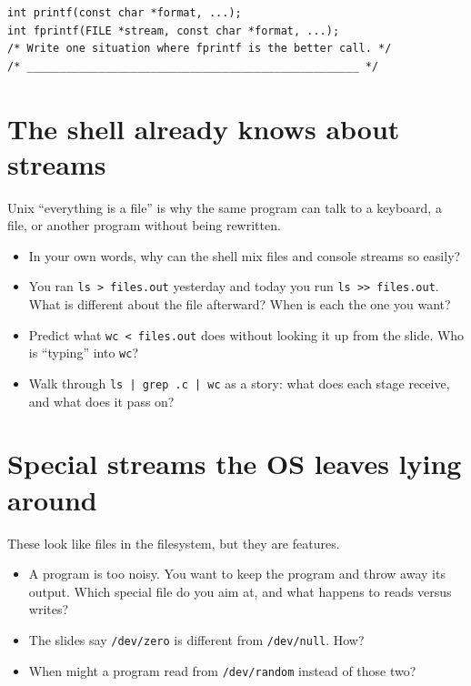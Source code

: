 \documentclass[12pt]{article}
\begin{document}
\begin{lstlisting}
int printf(const char *format, ...);
int fprintf(FILE *stream, const char *format, ...);
/* Write one situation where fprintf is the better call. */
/* ___________________________________________________ */
\end{lstlisting}

\vspace{1.8em}

\section{The shell already knows about streams}

Unix ``everything is a file'' is why the same program can talk to a keyboard, a file, or another program without being rewritten.

\begin{itemize}
  \item In your own words, why can the shell mix files and console streams so easily?
  \vspace{2.2em}
  \item You ran \texttt{ls > files.out} yesterday and today you run \texttt{ls >> files.out}. What is different about the file afterward? When is each the one you want?
  \vspace{2.4em}
  \item Predict what \texttt{wc < files.out} does without looking it up from the slide. Who is ``typing'' into \texttt{wc}?
  \vspace{2.2em}
  \item Walk through \texttt{ls | grep .c | wc} as a story: what does each stage receive, and what does it pass on?
  \vspace{2.4em}
\end{itemize}

\vspace{0.6em}

\section{Special streams the OS leaves lying around}

These look like files in the filesystem, but they are features.

\begin{itemize}
  \item A program is too noisy. You want to keep the program and throw away its output. Which special file do you aim at, and what happens to reads versus writes?
  \vspace{2.4em}
  \item The slides say \texttt{/dev/zero} is different from \texttt{/dev/null}. How?
  \vspace{2.4em}
  \item When might a program read from \texttt{/dev/random} instead of those two?
  \vspace{2.0em}
\end{itemize}
\end{document}
